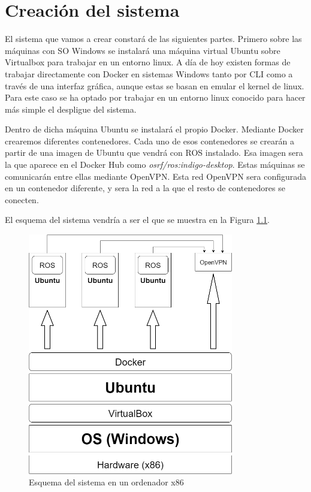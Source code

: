 \chapter{Creación del sistema}

El sistema que vamos a crear constará de las siguientes partes. Primero sobre las máquinas con SO Windows se instalará una máquina virtual Ubuntu sobre Virtualbox para trabajar en un entorno linux. A día de hoy existen formas de trabajar directamente con Docker en sistemas Windows tanto por CLI como a través de una interfaz gráfica, aunque estas se basan en emular el kernel de linux. Para este caso se ha optado por trabajar en un entorno linux conocido para hacer más simple el despligue del sistema.

Dentro de dicha máquina Ubuntu se instalará el propio Docker. Mediante Docker crearemos diferentes contenedores. Cada uno de esos contenedores se crearán a partir de una imagen de Ubuntu que vendrá con ROS instalado. Esa imagen sera la que aparece en el Docker Hub como \emph{osrf/ros:indigo-desktop}. Estas máquinas se comunicarán entre ellas mediante OpenVPN. Esta red OpenVPN sera configurada en un contenedor diferente, y sera la red a la que el resto de contenedores se conecten.

El esquema del sistema vendría a ser el que se muestra en la Figura \ref{fig:esquemaOriginal}.
\begin{figure}[H] %
	\centering
	\includegraphics[width=0.8\textwidth]{figuras/esquemaOriginal}
	\caption{Esquema del sistema en un ordenador x86}
	\label{fig:esquemaOriginal}
\end{figure}

